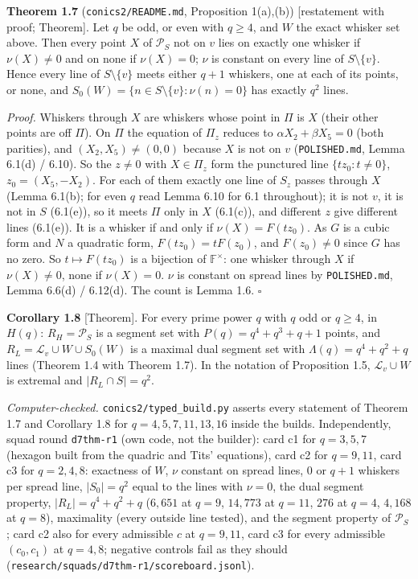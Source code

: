 \documentclass[
  10pt,
]{article}
\begin{document}
\textbf{Theorem 1.7} (\texttt{conics2/README.md}, Proposition 1(a),(b))
{[}restatement with proof; Theorem{]}. Let \(q\) be odd, or even with
\(q\ge4\), and \(W\) the exact whisker set above. Then every point \(X\)
of \(\mathcal P_S\) not on \(v\) lies on exactly one whisker if
\(\nu(X)\neq0\) and on none if \(\nu(X)=0\); \(\nu\) is constant on
every line of \(S\setminus\{v\}\). Hence every line of
\(S\setminus\{v\}\) meets either \(q+1\) whiskers, one at each of its
points, or none, and \(S_0(W)=\{n\in S\setminus\{v\}:\nu(n)=0\}\) has
exactly \(q^2\) lines.

\emph{Proof.} Whiskers through \(X\) are whiskers whose point in \(\Pi\)
is \(X\) (their other points are off \(\Pi\)). On \(\Pi\) the equation
of \(\Pi_z\) reduces to \(\alpha X_2+\beta X_5=0\) (both parities), and
\((X_2,X_5)\neq(0,0)\) because \(X\) is not on \(v\)
(\texttt{POLISHED.md}, Lemma 6.1(d) / 6.10). So the \(z\neq0\) with
\(X\in\Pi_z\) form the punctured line \(\{tz_0:t\neq0\}\),
\(z_0=(X_5,-X_2)\). For each of them exactly one line of \(S_z\) passes
through \(X\) (Lemma 6.1(b); for even \(q\) read Lemma 6.10 for 6.1
throughout); it is not \(v\), it is not in \(S\) (6.1(e)), so it meets
\(\Pi\) only in \(X\) (6.1(c)), and different \(z\) give different lines
(6.1(e)). It is a whisker if and only if \(\nu(X)=F(tz_0)\). As \(G\) is
a cubic form and \(N\) a quadratic form, \(F(tz_0)=tF(z_0)\), and
\(F(z_0)\neq0\) since \(G\) has no zero. So \(t\mapsto F(tz_0)\) is a
bijection of \(\mathbb F^\times\): one whisker through \(X\) if
\(\nu(X)\neq0\), none if \(\nu(X)=0\). \(\nu\) is constant on spread
lines by \texttt{POLISHED.md}, Lemma 6.6(d) / 6.12(d). The count is
Lemma 1.6. \(\square\)

\textbf{Corollary 1.8} {[}Theorem{]}. For every prime power \(q\) with
\(q\) odd or \(q\ge4\), in \(H(q)\): \(R_H=\mathcal P_S\) is a segment
set with \(P(q)=q^4+q^3+q+1\) points, and
\(R_L=\mathcal L_v\cup W\cup S_0(W)\) is a maximal dual segment set with
\(\Lambda(q)=q^4+q^2+q\) lines (Theorem 1.4 with Theorem 1.7). In the
notation of Proposition 1.5, \(\mathcal L_v\cup W\) is extremal and
\(|R_L\cap S|=q^2\).

\emph{Computer-checked.} \texttt{conics2/typed\_build.py} asserts every
statement of Theorem 1.7 and Corollary 1.8 for \(q=4,5,7,11,13,16\)
inside the builds. Independently, squad round \texttt{d7thm-r1} (own
code, not the builder): card c1 for \(q=3,5,7\) (hexagon built from the
quadric and Tits' equations), card c2 for \(q=9,11\), card c3 for
\(q=2,4,8\): exactness of \(W\), \(\nu\) constant on spread lines, \(0\)
or \(q+1\) whiskers per spread line, \(|S_0|=q^2\) equal to the lines
with \(\nu=0\), the dual segment property, \(|R_L|=q^4+q^2+q\)
(\(6{,}651\) at \(q=9\), \(14{,}773\) at \(q=11\), \(276\) at \(q=4\),
\(4{,}168\) at \(q=8\)), maximality (every outside line tested), and the
segment property of \(\mathcal P_S\); card c2 also for every admissible
\(c\) at \(q=9,11\), card c3 for every admissible \((c_0,c_1)\) at
\(q=4,8\); negative controls fail as they should
(\texttt{research/squads/d7thm-r1/scoreboard.jsonl}).
\end{document}
